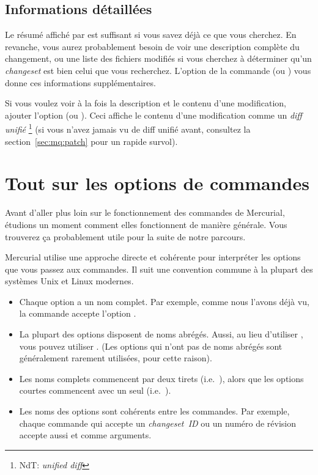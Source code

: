 \subsection{Informations détaillées}


Le résumé affiché par  est suffisant si vous savez déjà ce %
que vous cherchez. En revanche, vous aurez probablement besoin de voir une description
complète du changement, ou une liste des fichiers modifiés si vous 
cherchez à déterminer qu'un \textit{changeset} est bien celui que vous%
recherchez. L'option  de la commande  (ou 
) vous donne ces informations supplémentaires.

Si vous voulez voir à la fois la description et le contenu d'une 
modification, ajouter l'option  (ou ).
Ceci affiche le contenu d'une modification comme un \emph{diff unifié}
\footnote{NdT: \textit{unified diff}} (si vous n'avez jamais vu de diff 
unifié avant, consultez la section~\ref{sec:mq:patch} pour un rapide 
survol).


\section{Tout sur les options de commandes}


Avant d'aller plus loin sur le fonctionnement des commandes de Mercurial,
étudions un moment comment elles fonctionnent de manière générale. Vous
trouverez ça probablement utile pour la suite de notre parcours.

Mercurial utilise une approche directe et cohérente pour interpréter %
les options que vous passez aux commandes. Il suit une convention commune
à la plupart des systèmes Unix et Linux modernes.

\begin{itemize}
\item Chaque option a un nom complet. Par exemple, comme nous l'avons déjà
      vu, la commande  accepte l'option .%
\item La plupart des options disposent de noms abrégés. Aussi, au lieu d'utiliser
  , vous pouvez utiliser . (Les options qui
  n'ont pas de noms abrégés sont généralement rarement utilisées, pour cette raison).
\item Les noms complets commencent par deux tirets (i.e.~),
  alors que les options courtes commencent avec un seul (i.e.~).
\item Les noms des options sont cohérents entre les commandes. Par exemple, 
  chaque commande qui accepte un \textit{changeset~ID} ou un numéro de révision
  accepte aussi  et  comme arguments.
\end{itemize}

